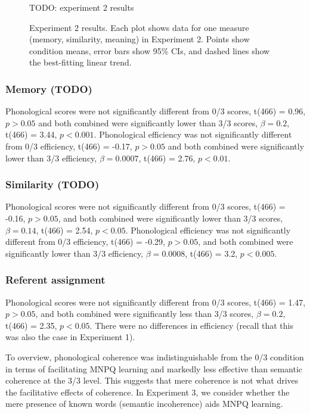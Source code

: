 \documentclass[man,floatsintext]{apa6}
\begin{document}
\begin{figure}[t]
  \label{expt2-results}
  \caption{Experiment 2 results. Each plot shows data for one measure (memory, similarity, meaning) in Experiment 2. Points show condition means, error bars show 95\% CIs, and dashed lines show the best-fitting linear trend.}
  \begin{center}
    TODO: experiment 2 results
  \end{center}
\end{figure}

\subsubsection{Memory (TODO)}
Phonological scores were not significantly different from 0/3 scores, t(466) = 0.96, $p > 0.05$ and both combined were significantly lower than 3/3 scores, $\beta = 0.2$, t(466) = 3.44, $p < 0.001$. Phonological efficiency was not significantly different from 0/3 efficiency, t(466) = -0.17, $p > 0.05$ and both combined were significantly lower than 3/3 efficiency, $\beta = 0.0007$, t(466) = 2.76, $p < 0.01$.

\subsubsection{Similarity (TODO)}
Phonological scores were not significantly different from 0/3 scores, t(466) = -0.16, $p > 0.05$, and both combined were significantly lower than 3/3 scores, $\beta = 0.14$, t(466) = 2.54, $p < 0.05$. Phonological efficiency was not significantly different from 0/3 efficiency, t(466) = -0.29, $p > 0.05$, and both combined were significantly lower than 3/3 efficiency, $\beta = 0.0008$, t(466) = 3.2, $p < 0.005$.

\subsubsection{Referent assignment}
Phonological scores were not significantly different from 0/3 scores, t(466) = 1.47, $p > 0.05$, and both combined were significantly less than 3/3 scores, $\beta = 0.2$, t(466) = 2.35, $p < 0.05$. There were no differences in efficiency (recall that this was also the case in Experiment 1).

To overview, phonological coherence was indistinguishable from the 0/3 condition in terms of facilitating MNPQ learning and markedly less effective than semantic coherence at the 3/3 level. This suggests that mere coherence is not what drives the facilitative effects of coherence. In Experiment 3, we consider whether the mere presence of known words (semantic incoherence) aids MNPQ learning.
\end{document}
